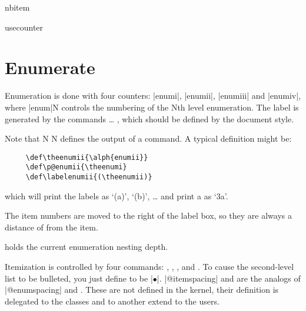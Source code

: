 \begin{texcode}{}{}
    \begin{teX}
\def\makelabel#1{%
  \@latex@error{Lonely \string\item--perhaps a missing
        list environment}\@ehc}
    \end{teX}
 

 \begin{docCommand}{nbitem}{}
 \end{docCommand}
    \begin{teX}
\def\@nbitem{%
  \@tempskipa\@outerparskip
  \advance\@tempskipa -\parskip
  \addvspace\@tempskipa}
    \end{teX}

 \begin{docCommand}{usecounter}{}
 \end{docCommand}
    \begin{teX}
\def\usecounter#1{\@nmbrlisttrue\def\@listctr{#1}\setcounter{#1}\z@}
    \end{teX}


 \section{Enumerate}

  Enumeration is done with four counters: |enumi|, |enumii|, |enumiii|
  and |enumiv|, where |enum|N controls the numbering of the Nth level
  enumeration.  The label is generated by the commands
   \ldots{} , which should be defined
  by the document style.
  
  Note that N N defines the output
  of a  command.  A typical definition might be:
  
 \begin{verbatim}
     \def\theenumii{\alph{enumii}}
     \def\p@enumii{\theenumi}
     \def\labelenumii{(\theenumii)}
 \end{verbatim}
 which will print the labels as `(a)', `(b)', \ldots
 and print a  as `3a'.

 The item numbers are moved to the right of the label box, so they are
 always a distance of  from the item.

  holds the current enumeration nesting depth.

 Itemization is controlled by four commands: ,
 ,
 , and .
 To cause the second-level list to be
 bulleted, you just define 
 to be |$\bullet$|.  |@itemspacing|
 and  are the analogs of |@enumspacing| and
 . These are not defined in the kernel, their definition is delegated to the classes and to another extend to the users.



\end{texcode}

